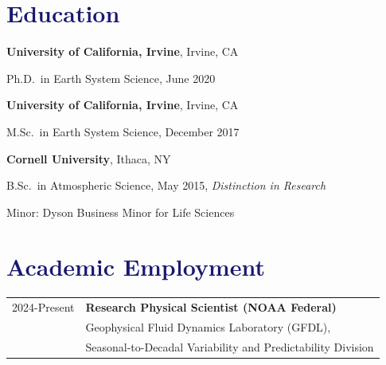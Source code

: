 \documentclass[margin,line,palatino,courier,10pt]{res}
\newenvironment{list1}{
  \begin{list}{\ding{113}}{%
      \setlength{\itemsep}{0in}
      \setlength{\parsep}{0in} \setlength{\parskip}{0in}
      \setlength{\topsep}{0in} \setlength{\partopsep}{0in}
      \setlength{\leftmargin}{0.17in}}}{\end{list}}
\begin{document}
\begin{resume}
\vspace{-0.1in}
\noindent\textcolor{MidnightBlue}{\makebox[\linewidth][r]{\rule{\textwidth}{5pt}}}
\vspace{-0.3in}
\renewcommand{\arraystretch}{1.4}
\section{\sc \large{\textcolor{MidnightBlue}{\textbf{Education}}}}

{\bf University of California, Irvine}, Irvine, CA\\
\vspace*{-.12in}
\begin{list1}
\item[] Ph.D.~in Earth System Science, June 2020
\end{list1}

{\bf University of California, Irvine}, Irvine, CA\\
\vspace*{-.12in}
\begin{list1}
\item[] M.Sc.~in Earth System Science, December 2017
\end{list1}

{\bf Cornell University}, Ithaca, NY\\
\vspace*{-.12in}
\begin{list1}
\item[] B.Sc.~in Atmospheric Science, May 2015, \textit{Distinction in Research}

\hspace*{0.2in}  Minor: Dyson Business Minor for Life Sciences

\end{list1}

\section{\sc \textcolor{MidnightBlue}{\large{\textbf{Academic Employment}}}}
\vspace*{0.05in}
\begin{tabular}{@{}p{0.9in}p{4in}}
2024-Present & \textbf{Research Physical Scientist (NOAA Federal)}\\
& \hspace{0.2in} Geophysical Fluid Dynamics Laboratory (GFDL),\\
& \vspace{-0.18in}\hspace{0.2in} Seasonal-to-Decadal Variability and Predictability Division\\


\end{tabular}
\end{resume}
\end{document}
